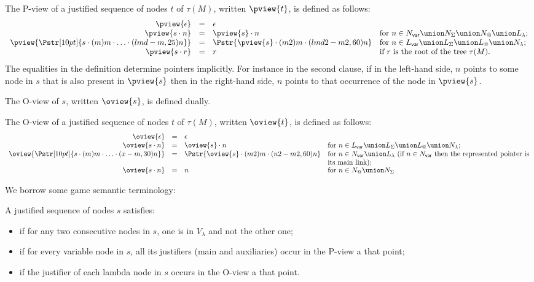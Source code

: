 \begin{definition}
The P-view of a justified sequence of nodes $t$ of $\tau(M)$, written $\pview{t}$, is defined as follows:
$$\begin{array}{rcll}
 \pview{\epsilon} &=&  \epsilon \\
 \pview{s \cdot n }  &=&  \pview{s} \cdot n
    & \mbox{for $n \in N_{\sf var} \union N_\Sigma \union N_@ \union L_\lambda$;}
    \\
 \pview{\Pstr[10pt]{ s \cdot (m){m} \cdot \ldots \cdot (lmd-m,25){n}}} &=&
        \Pstr{ \pview{s} \cdot (m2){m} \cdot (lmd2-m2,60){n} }
    & \mbox{for $n \in L_{\sf var} \union L_\Sigma \union L_@ \union N_\lambda$;}
    \\
 \pview{s \cdot r }  &=&  r
    & \mbox{if $r$ is the root of the tree $\tau(M)$. }
    \\
\end{array}$$
The equalities in the definition determine pointers implicitly. For
instance in the second clause, if in the left-hand side, $n$ points
to some node in $s$  that is also present in $\pview{s}$ then in the
right-hand side, $n$ points to that occurrence of the node in
$\pview{s}$.
\end{definition}

The O-view of $s$, written $\oview{s}$, is defined dually.
\begin{definition}
The O-view of a justified sequence of nodes $t$ of $\tau(M)$, written $\oview{t}$, is defined as follows:
$$\begin{array}{rcll}
 \oview{\epsilon} &=&  \epsilon \\
 \oview{s \cdot n }  &=&  \oview{s} \cdot n
    & \mbox{for $n \in L_{\sf var} \union L_\Sigma \union L_@ \union N_\lambda$;}
    \\
 \oview{\Pstr[10pt]{s \cdot (m){m} \cdot \ldots \cdot (x-m,30){n}}} &=&
    \Pstr{ \oview{s} \cdot (m2){m} \cdot (n2-m2,60){n} }
    & \parbox[t]{10cm}{for $n \in N_{\sf var} \union L_\lambda$ (if $n \in N_{\sf var}$ then the represented pointer is its main link);}
    \\
 \oview{s \cdot n }  &=&  n
    & \mbox{for $n \in N_@ \union N_\Sigma$ }
    \\

\end{array}$$
\end{definition}

We borrow some game semantic terminology:
\begin{definition} A justified sequence of nodes $s$ satisfies:
\begin{itemize}[-]
\item {} if for any two consecutive nodes in $s$, one is in $V_\lambda$ and not the other one;
\item {} if for every variable node in $s$, all its justifiers (main and auxiliaries) occur in the P-view a that point;
\item  {} if the justifier of each lambda node in $s$ occurs in the O-view a that point.
\end{itemize}
\end{definition}

